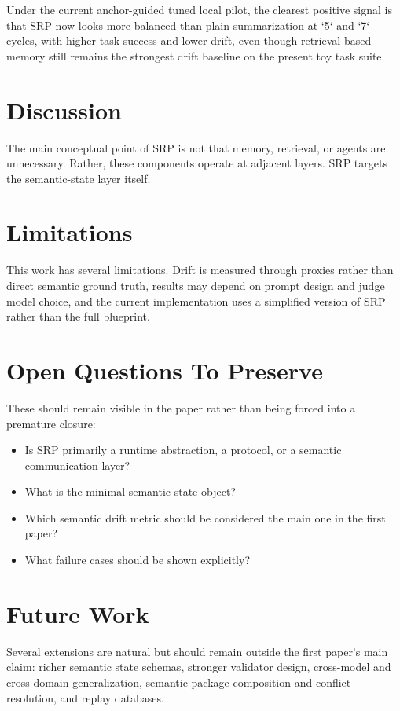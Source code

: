 \documentclass{article}
\begin{document}
Under the current anchor-guided tuned local pilot, the clearest positive signal is that SRP now looks more balanced than plain summarization at `5` and `7` cycles, with higher task success and lower drift, even though retrieval-based memory still remains the strongest drift baseline on the present toy task suite.

\section{Discussion}
The main conceptual point of SRP is not that memory, retrieval, or agents are unnecessary. Rather, these components operate at adjacent layers. SRP targets the semantic-state layer itself.

\section{Limitations}
This work has several limitations. Drift is measured through proxies rather than direct semantic ground truth, results may depend on prompt design and judge model choice, and the current implementation uses a simplified version of SRP rather than the full blueprint.

\section{Open Questions To Preserve}
These should remain visible in the paper rather than being forced into a premature closure:

\begin{itemize}[leftmargin=*]
  \item Is SRP primarily a runtime abstraction, a protocol, or a semantic communication layer?
  \item What is the minimal semantic-state object?
  \item Which semantic drift metric should be considered the main one in the first paper?
  \item What failure cases should be shown explicitly?
\end{itemize}

\section{Future Work}
Several extensions are natural but should remain outside the first paper's main claim: richer semantic state schemas, stronger validator design, cross-model and cross-domain generalization, semantic package composition and conflict resolution, and replay databases.
\end{document}
